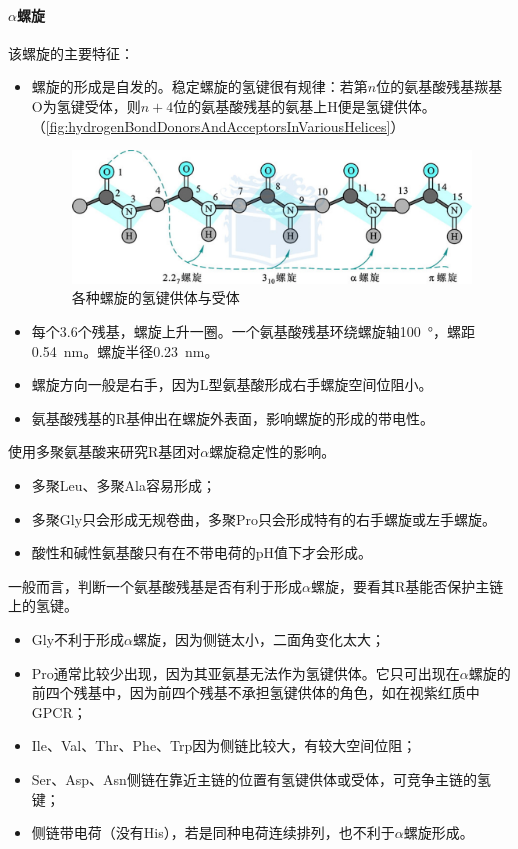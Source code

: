 \paragraph{$\alpha$螺旋}

该螺旋的主要特征：
\begin{itemize}
	\item 螺旋的形成是自发的。稳定螺旋的氢键很有规律：若第$n$位的氨基酸残基羰基O为氢键受体，则$n+4$位的氨基酸残基的氨基上H便是氢键供体。（\autoref{fig:hydrogenBondDonorsAndAcceptorsInVariousHelices}）

	\begin{figure}[htbp]
		\centering
		\includegraphics[width=0.8\linewidth]{Pics/各种螺旋的氢键供体与受体}
		\caption{各种螺旋的氢键供体与受体}
		\label{fig:hydrogenBondDonorsAndAcceptorsInVariousHelices}
	\end{figure}

	\item 每个3.6个残基，螺旋上升一圈。一个氨基酸残基环绕螺旋轴\SI{100}{\degree}，螺距\SI{0.54}{\nm}。螺旋半径\SI{0.23}{\nm}。
	\item 螺旋方向一般是右手，因为L型氨基酸形成右手螺旋空间位阻小。
	\item 氨基酸残基的R基伸出在螺旋外表面，影响螺旋的形成的带电性。
\end{itemize}

使用多聚氨基酸来研究R基团对$\alpha$螺旋稳定性的影响。
\begin{itemize}
	\item 多聚Leu、多聚Ala容易形成；
	\item 多聚Gly只会形成无规卷曲，多聚Pro只会形成特有的右手螺旋或左手螺旋。
	\item 酸性和碱性氨基酸只有在不带电荷的pH值下才会形成。
\end{itemize}

一般而言，判断一个氨基酸残基是否有利于形成$\alpha$螺旋，要看其R基能否保护主链上的氢键。
\begin{itemize}
	\item Gly不利于形成$\alpha$螺旋，因为侧链太小，二面角变化太大；
	\item Pro通常比较少出现，因为其亚氨基无法作为氢键供体。它只可出现在$\alpha$螺旋的前四个残基中，因为前四个残基不承担氢键供体的角色，如在视紫红质中GPCR；
	\item Ile、Val、Thr、Phe、Trp因为侧链比较大，有较大空间位阻；
	\item Ser、Asp、Asn侧链在靠近主链的位置有氢键供体或受体，可竞争主链的氢键；
	\item 侧链带电荷（没有His），若是同种电荷连续排列，也不利于$\alpha$螺旋形成。
\end{itemize}

